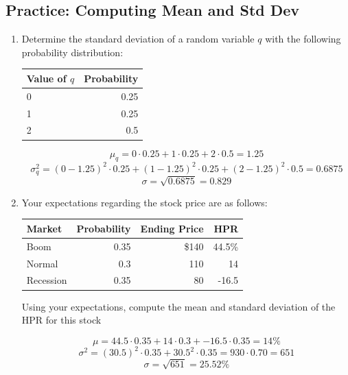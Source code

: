 \documentclass[11pt]{article}
\theoremstyle{definition}
\begin{document}
    \begin{shaded}
    \subsection{Practice: Computing Mean and Std Dev}
      \begin{enumerate}
      \setcounter{enumi}{0}
          \item Determine the standard deviation of a random variable $q$ with the following probability distribution:

        \begin{tabular}{lr}
          \toprule
          Value of $q$ & Probability \\
          \midrule
          0 & 0.25 \\
          1 & 0.25 \\
          2 & 0.5 \\
          \bottomrule
        \end{tabular}

        $$\mu_q = 0\cdot0.25 + 1\cdot0.25 + 2\cdot0.5 = 1.25$$
        $$\sigma^2_q = (0-1.25)^2\cdot0.25 + (1-1.25)^2\cdot0.25 + (2-1.25)^2 \cdot 0.5 = 0.6875$$
        $$\sigma = \sqrt{0.6875} = 0.829$$

        \item Your expectations regarding the stock price are as follows:\\
        \vspace{1em}
        
            \begin{tabular}{lrrr}
              \toprule
              Market & Probability & Ending Price & HPR\\
              \midrule
              Boom & 0.35 & \$140 & 44.5\%\\
              Normal & 0.3 & 110 & 14\\
              Recession & 0.35 & 80 & -16.5\\
              \bottomrule
            \end{tabular}
            
        Using your expectations, compute the mean and standard deviation of the HPR for this stock

        $$\mu = 44.5\cdot0.35 + 14\cdot0.3 + -16.5\cdot0.35 = 14\%$$
        $$\sigma^2 = (30.5)^2\cdot0.35 + 30.5^2\cdot0.35 = 930\cdot0.70 = 651$$
        $$\sigma = \sqrt{651} = 25.52\%$$
        
      \end{enumerate}
  \end{shaded}
\end{document}
